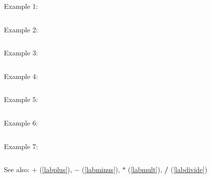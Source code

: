 \noindent Example 1: 
\begin{center}\begin{minipage}{15cm}\begin{Verbatim}[frame=single]
\end{Verbatim}
\end{minipage}\end{center}
\noindent Example 2: 
\begin{center}\begin{minipage}{15cm}\begin{Verbatim}[frame=single]
\end{Verbatim}
\end{minipage}\end{center}
\noindent Example 3: 
\begin{center}\begin{minipage}{15cm}\begin{Verbatim}[frame=single]
\end{Verbatim}
\end{minipage}\end{center}
\noindent Example 4: 
\begin{center}\begin{minipage}{15cm}\begin{Verbatim}[frame=single]
\end{Verbatim}
\end{minipage}\end{center}
\noindent Example 5: 
\begin{center}\begin{minipage}{15cm}\begin{Verbatim}[frame=single]
\end{Verbatim}
\end{minipage}\end{center}
\noindent Example 6: 
\begin{center}\begin{minipage}{15cm}\begin{Verbatim}[frame=single]
\end{Verbatim}
\end{minipage}\end{center}
\noindent Example 7: 
\begin{center}\begin{minipage}{15cm}\begin{Verbatim}[frame=single]
\end{Verbatim}
\end{minipage}\end{center}
See also: \textbf{$+$} (\ref{labplus}), \textbf{$-$} (\ref{labminus}), \textbf{$*$} (\ref{labmult}), \textbf{/} (\ref{labdivide})
